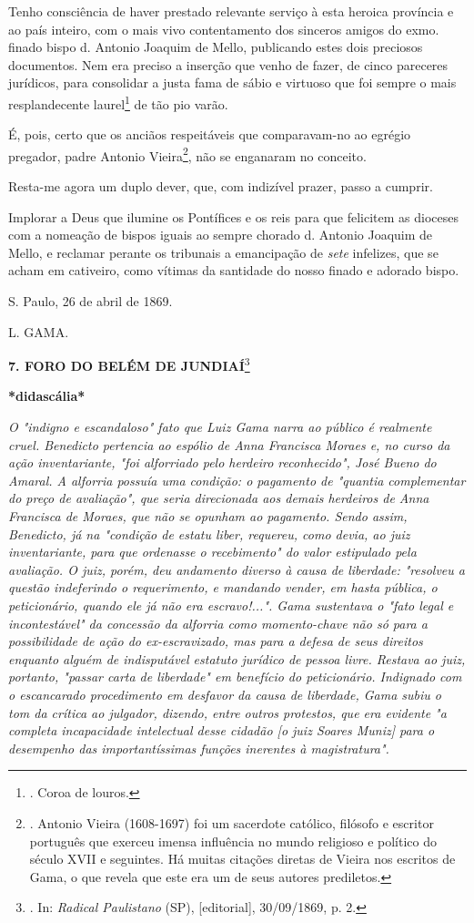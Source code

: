 Tenho consciência de haver prestado relevante serviço à esta heroica
província e ao país inteiro, com o mais vivo contentamento dos sinceros
amigos do exmo. finado bispo d. Antonio Joaquim de Mello, publicando
estes dois preciosos documentos. Nem era preciso a inserção que venho de
fazer, de cinco pareceres jurídicos, para consolidar a justa fama de
sábio e virtuoso que foi sempre o mais resplandecente laurel\footnote{.
  Coroa de louros.} de tão pio varão.

É, pois, certo que os anciãos respeitáveis que comparavam-no ao egrégio
pregador, padre Antonio Vieira\footnote{. Antonio Vieira (1608-1697) foi
  um sacerdote católico, filósofo e escritor português que exerceu
  imensa influência no mundo religioso e político do século XVII e
  seguintes. Há muitas citações diretas de Vieira nos escritos de Gama,
  o que revela que este era um de seus autores prediletos.}, não se
enganaram no conceito.

Resta-me agora um duplo dever, que, com indizível prazer, passo a
cumprir.

Implorar a Deus que ilumine os Pontífices e os reis para que felicitem
as dioceses com a nomeação de bispos iguais ao sempre chorado d. Antonio
Joaquim de Mello, e reclamar perante os tribunais a emancipação de
\emph{sete} infelizes, que se acham em cativeiro, como vítimas da
santidade do nosso finado e adorado bispo.

S. Paulo, 26 de abril de 1869.

L. GAMA.

\textbf{7. FORO DO BELÉM DE JUNDIAÍ}\footnote{. In: \emph{Radical
  Paulistano} (SP), {[}editorial{]}, 30/09/1869, p. 2.}

\textbf{*didascália*}

\emph{O "indigno e escandaloso" fato que Luiz Gama narra ao público é
realmente cruel. Benedicto pertencia ao espólio de Anna Francisca Moraes
e, no curso da ação inventariante, "foi alforriado pelo herdeiro
reconhecido", José Bueno do Amaral. A alforria possuía uma condição: o
pagamento de "quantia complementar do preço de avaliação", que seria
direcionada aos demais herdeiros de Anna Francisca de Moraes, que não se
opunham ao pagamento. Sendo assim, Benedicto, já na "condição de estatu
liber, requereu, como devia, ao juiz inventariante, para que ordenasse o
recebimento" do valor estipulado pela avaliação. O juiz, porém, deu
andamento diverso à causa de liberdade: "resolveu a questão indeferindo
o requerimento, e mandando vender, em hasta pública, o peticionário,
quando ele já não era escravo!...". Gama sustentava o "fato legal e
incontestável" da concessão da alforria como momento-chave não só para a
possibilidade de ação do ex-escravizado, mas para a defesa de seus
direitos enquanto alguém de indisputável estatuto jurídico de pessoa
livre. Restava ao juiz, portanto, "passar carta de liberdade" em
benefício do peticionário. Indignado com o escancarado procedimento em
desfavor da causa de liberdade, Gama subiu o tom da crítica ao julgador,
dizendo, entre outros protestos, que era evidente "a completa
incapacidade intelectual desse cidadão {[}o juiz Soares Muniz{]} para o
desempenho das importantíssimas funções inerentes à magistratura".}


